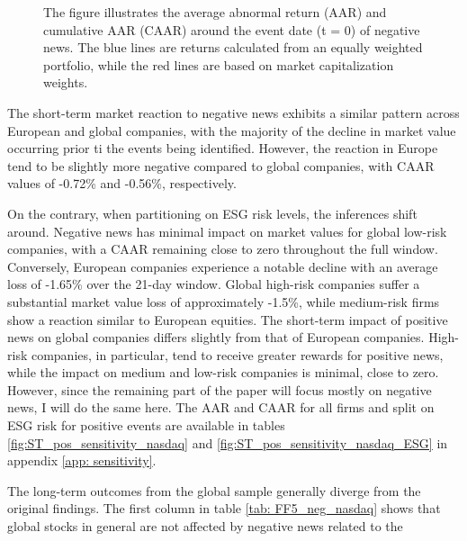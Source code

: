\begin{figure} [H]
\begin{minipage}[b]{0.49\textwidth}
    \label{fig:ST_pos_sensitivity_nasdaq}
     \end{minipage}
        \caption*{\footnotesize The figure illustrates the average abnormal return (AAR) and cumulative AAR (CAAR) around the event date (t = 0) of negative news. The blue lines are returns calculated from an equally weighted portfolio, while the red lines are based on market capitalization weights.}
        
        \label{fig:three graphs}
\end{figure}

The short-term market reaction to negative news exhibits a similar pattern across European and global companies, with the majority of the decline in market value occurring prior ti the events being identified. However, the reaction in Europe tend to be slightly more negative compared to global companies, with CAAR values of -0.72\% and -0.56\%, respectively. 

On the contrary, when partitioning on ESG risk levels, the inferences shift around. 
Negative news has minimal impact on market values for global low-risk companies, with a CAAR remaining close to zero throughout the full window. Conversely, European companies experience a notable decline with an average loss of -1.65\% over the 21-day window.  Global high-risk companies suffer a substantial market value loss of approximately -1.5\%, while medium-risk firms show a reaction similar to European equities. The short-term impact of positive news on global companies differs slightly from that of European companies. High-risk companies, in particular, tend to receive greater rewards for positive news, while the impact on medium and low-risk companies is minimal, close to zero. However, since the remaining part of the paper will focus mostly on negative news, I will do the same here. The AAR and CAAR for all firms and split on ESG risk for positive events are available in tables \ref{fig:ST_pos_sensitivity_nasdaq} and \ref{fig:ST_pos_sensitivity_nasdaq_ESG} in appendix \ref{app: sensitivity}.

The long-term outcomes from the global sample generally diverge from the original findings. The first column in table \ref{tab: FF5_neg_nasdaq} shows that global stocks in general are not affected by negative news related to the  

